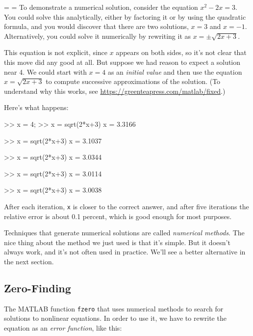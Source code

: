 
{\binoppenalty=\maxdimen%
\relpenalty=\maxdimen%
To demonstrate a numerical solution, consider the equation $x^2 - 2x = 3$.  You could solve this analytically, either by factoring it or by
using the quad\-ratic formula, and you would discover that there are
two solutions, $x=3$ and $x=-1$.  Alternatively, you could solve it
numerically by rewriting it as $x = \pm \sqrt{2x+3}$.}

This equation is not explicit, since $x$ appears on both sides, so
it's not clear that this move did any good at all.  But suppose we had
reason to expect a solution near 4.
We could start with $x=4$ as an \emph{initial value} and then use
the equation $x = \sqrt{2x+3}$ to compute successive
approximations of the solution. (To understand why this
works, see \url{https://greenteapress.com/matlab/fixed}.)


Here's what happens:

\begin{code}
>> x = 4;
>> x = sqrt(2*x+3)
x = 3.3166

>> x = sqrt(2*x+3)
x = 3.1037

>> x = sqrt(2*x+3)
x = 3.0344

>> x = sqrt(2*x+3)
x = 3.0114

>> x = sqrt(2*x+3)
x = 3.0038
\end{code}

After each iteration, \lstinline{x} is closer to the correct answer,
and after five iterations the relative error is about 0.1 percent, which
is good enough for most purposes.


Techniques that generate numerical solutions are called
\emph{numerical \mbox{methods}}.
The nice thing about the method we just used is that it's simple.  But it doesn't always
work, and it's not often used in practice.
We'll see a better alternative in the next section.

\subsection{Zero-Finding}
\label{zero}


The MATLAB function \lstinline{fzero} that uses numerical methods to search for solutions to nonlinear equations.  In order to use it, we have to rewrite the equation as an \emph{error function}, like this:

